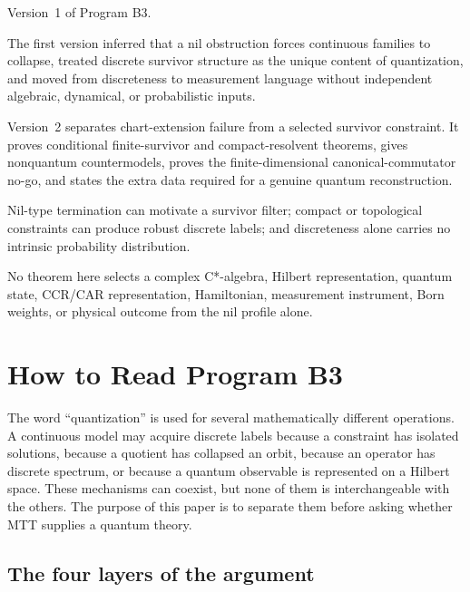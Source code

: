 \documentclass[11pt]{article}
\begin{document}
\begin{description}[leftmargin=2.5cm,style=nextline]
\item[Supersedes.]
Version~1 of Program B3.

\item[Reason.]
The first version inferred that a nil obstruction forces continuous families
to collapse, treated discrete survivor structure as the unique content of
quantization, and moved from discreteness to measurement language without
independent algebraic, dynamical, or probabilistic inputs.

\item[Resolution.]
Version~2 separates chart-extension failure from a selected survivor
constraint.  It proves conditional finite-survivor and compact-resolvent
theorems, gives nonquantum countermodels, proves the finite-dimensional
canonical-commutator no-go, and states the extra data required for a genuine
quantum reconstruction.

\item[Retained content.]
Nil-type termination can motivate a survivor filter; compact or topological
constraints can produce robust discrete labels; and discreteness alone carries
no intrinsic probability distribution.

\item[Open boundary.]
No theorem here selects a complex C*-algebra, Hilbert representation, quantum
state, CCR/CAR representation, Hamiltonian, measurement instrument, Born
weights, or physical outcome from the nil profile alone.
\end{description}

\tableofcontents
\newpage

\section{How to Read Program B3}

The word ``quantization'' is used for several mathematically different
operations.  A continuous model may acquire discrete labels because a
constraint has isolated solutions, because a quotient has collapsed an orbit,
because an operator has discrete spectrum, or because a quantum observable is
represented on a Hilbert space.  These mechanisms can coexist, but none of
them is interchangeable with the others.  The purpose of this paper is to
separate them before asking whether MTT supplies a quantum theory.

\subsection{The four layers of the argument}
\end{document}
